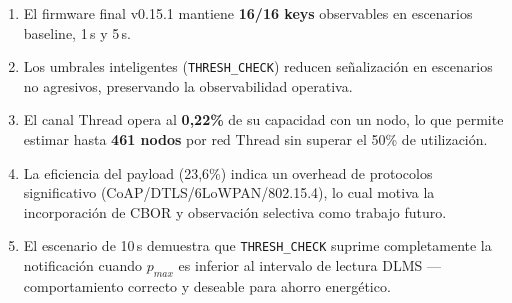 \documentclass[11pt,spanish,letterpaper]{article}
\begin{document}
\begin{enumerate}
    \item El firmware final v0.15.1 mantiene \textbf{16/16 keys} observables en
    escenarios baseline, 1\,s y 5\,s.

    \item Los umbrales inteligentes (\texttt{THRESH\_CHECK}) reducen señalización
    en escenarios no agresivos, preservando la observabilidad operativa.

    \item El canal Thread opera al \textbf{0,22\%} de su capacidad con un nodo,
    lo que permite estimar hasta \textbf{461 nodos} por red Thread sin superar
    el 50\% de utilización.

    \item La eficiencia del payload (23,6\%) indica un overhead de protocolos
    significativo (CoAP/DTLS/6LoWPAN/802.15.4), lo cual motiva la incorporación
    de CBOR y observación selectiva como trabajo futuro.

    \item El escenario de 10\,s demuestra que \texttt{THRESH\_CHECK} suprime
    completamente la notificación cuando $p_{max}$ es inferior al intervalo
    de lectura DLMS --- comportamiento correcto y deseable para ahorro energético.
\end{enumerate}
\end{document}
